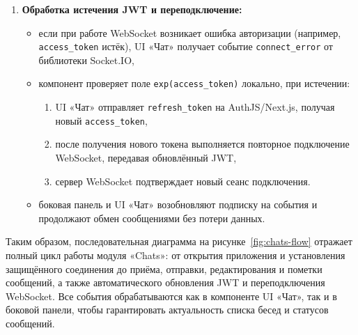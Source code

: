 \begin{enumerate}
    \item \textbf{Обработка истечения JWT и переподключение:}
    \begin{itemize}
        \item если при работе WebSocket возникает ошибка авторизации (например, \texttt{access\_token} истёк), UI «Чат» получает событие \texttt{connect\_error} от библиотеки Socket.IO,
        \item компонент проверяет поле \texttt{exp(access\_token)} локально, при истечении:
        \begin{enumerate}
            \item UI «Чат» отправляет \texttt{refresh\_token} на AuthJS/Next.js, получая новый \texttt{access\_token},
            \item после получения нового токена выполняется повторное подключение WebSocket, передавая обновлённый JWT,
            \item сервер WebSocket подтверждает новый сеанс подключения.
        \end{enumerate}
        \item боковая панель и UI «Чат» возобновляют подписку на события и продолжают обмен сообщениями без потери данных.
    \end{itemize}
\end{enumerate}

Таким образом, последовательная диаграмма на рисунке~\ref{fig:chats-flow} отражает полный цикл работы модуля «Chats»: от открытия приложения и установления защищённого соединения до приёма, отправки, редактирования и пометки сообщений, а также автоматического обновления JWT и переподключения WebSocket. Все события обрабатываются как в компоненте UI «Чат», так и в боковой панели, чтобы гарантировать актуальность списка бесед и статусов сообщений.
